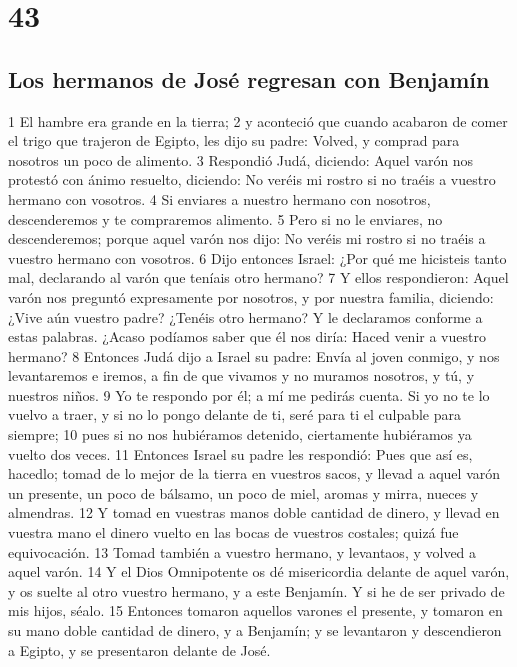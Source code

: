 \chapter{43}

\section*{Los hermanos de José regresan con Benjamín}

1 El hambre era grande en la tierra;
2 y aconteció que cuando acabaron de comer el trigo que trajeron de Egipto, les dijo su padre: Volved, y comprad para nosotros un poco de alimento.
3 Respondió Judá, diciendo: Aquel varón nos protestó con ánimo resuelto, diciendo: No veréis mi rostro si no traéis a vuestro hermano con vosotros.
4 Si enviares a nuestro hermano con nosotros, descenderemos y te compraremos alimento.
5 Pero si no le enviares, no descenderemos; porque aquel varón nos dijo: No veréis mi rostro si no traéis a vuestro hermano con vosotros.
6 Dijo entonces Israel: ¿Por qué me hicisteis tanto mal, declarando al varón que teníais otro hermano?
7 Y ellos respondieron: Aquel varón nos preguntó expresamente por nosotros, y por nuestra familia, diciendo: ¿Vive aún vuestro padre? ¿Tenéis otro hermano? Y le declaramos conforme a estas palabras. ¿Acaso podíamos saber que él nos diría: Haced venir a vuestro hermano?
8 Entonces Judá dijo a Israel su padre: Envía al joven conmigo, y nos levantaremos e iremos, a fin de que vivamos y no muramos nosotros, y tú, y nuestros niños.
9 Yo te respondo por él; a mí me pedirás cuenta. Si yo no te lo vuelvo a traer, y si no lo pongo delante de ti, seré para ti el culpable para siempre;
10 pues si no nos hubiéramos detenido, ciertamente hubiéramos ya vuelto dos veces.
11 Entonces Israel su padre les respondió: Pues que así es, hacedlo; tomad de lo mejor de la tierra en vuestros sacos, y llevad a aquel varón un presente, un poco de bálsamo, un poco de miel, aromas y mirra, nueces y almendras.
12 Y tomad en vuestras manos doble cantidad de dinero, y llevad en vuestra mano el dinero vuelto en las bocas de vuestros costales; quizá fue equivocación.
13 Tomad también a vuestro hermano, y levantaos, y volved a aquel varón.
14 Y el Dios Omnipotente os dé misericordia delante de aquel varón, y os suelte al otro vuestro hermano, y a este Benjamín. Y si he de ser privado de mis hijos, séalo.
15 Entonces tomaron aquellos varones el presente, y tomaron en su mano doble cantidad de dinero, y a Benjamín; y se levantaron y descendieron a Egipto, y se presentaron delante de José.
